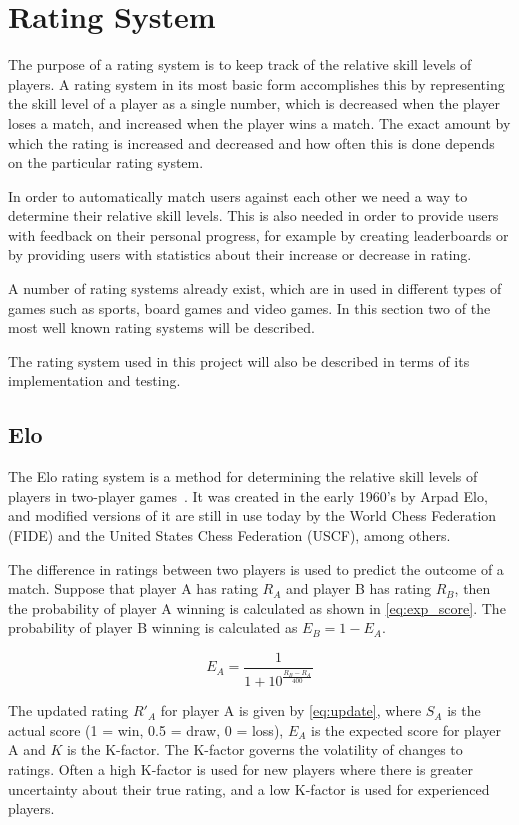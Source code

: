 \section{Rating System}
The purpose of a rating system is to keep track of the relative skill levels of players.
A rating system in its most basic form accomplishes this by representing the skill level of a player as a single number, which is decreased when the player loses a match, and increased when the player wins a match.
The exact amount by which the rating is increased and decreased and how often this is done depends on the particular rating system.

In order to automatically match users against each other we need a way to determine their relative skill levels.
This is also needed in order to provide users with feedback on their personal progress, for example by creating leaderboards or by providing users with statistics about their increase or decrease in rating.

A number of rating systems already exist, which are in used in different types of games such as sports, board games and video games.
In this section two of the most well known rating systems will be described.

The rating system used in this project will also be described in terms of its implementation and testing.

\subsection{Elo}
\label{sec:elo}
The Elo rating system is a method for determining the relative skill levels of players in two-player games~\citep{elo}.
It was created in the early 1960's by Arpad Elo, and modified versions of it are still in use today by the World Chess Federation (FIDE) and the United States Chess Federation (USCF), among others.

The difference in ratings between two players is used to predict the outcome of a match.
Suppose that player A has rating $R_A$ and player B has rating $R_B$, then the probability of player A winning is calculated as shown in \autoref{eq:exp_score}.
The probability of player B winning is calculated as $E_B = 1 - E_A$.

\begin{equation} \label{eq:exp_score}
E_A = \frac{1}{1 + 10^\frac{R_B - R_A}{400}}
\end{equation}

The updated rating $R'_A$ for player A is given by \autoref{eq:update}, where $S_A$ is the actual score (1 = win, 0.5 = draw, 0 = loss), $E_A$ is the expected score for player A and $K$ is the K-factor.
The K-factor governs the volatility of changes to ratings.
Often a high K-factor is used for new players where there is greater uncertainty about their true rating, and a low K-factor is used for experienced players.

